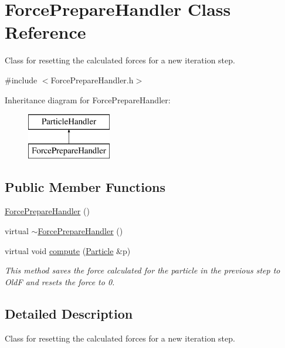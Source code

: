 \hypertarget{classForcePrepareHandler}{\section{Force\-Prepare\-Handler Class Reference}
\label{classForcePrepareHandler}
}


Class for resetting the calculated forces for a new iteration step.  




{\ttfamily \#include $<$Force\-Prepare\-Handler.\-h$>$}

Inheritance diagram for Force\-Prepare\-Handler\-:\begin{figure}[H]
\begin{center}
\leavevmode
\includegraphics[height=2.000000cm]{classForcePrepareHandler}
\end{center}
\end{figure}
\subsection*{Public Member Functions}
\begin{DoxyCompactItemize}
\item 
\hyperlink{classForcePrepareHandler_a430833a14abbe091569b200a7f4fc91a}{Force\-Prepare\-Handler} ()
\item 
virtual \hyperlink{classForcePrepareHandler_a680814e48b86a8cf369e6a1183508a76}{$\sim$\-Force\-Prepare\-Handler} ()
\item 
virtual void \hyperlink{classForcePrepareHandler_a06426453873836601e3addff521e00ca}{compute} (\hyperlink{classParticle}{Particle} \&p)
\begin{DoxyCompactList}\small\item\em This method saves the force calculated for the particle in the previous step to Old\-F and resets the force to 0. \end{DoxyCompactList}\end{DoxyCompactItemize}


\subsection{Detailed Description}
Class for resetting the calculated forces for a new iteration step. 

